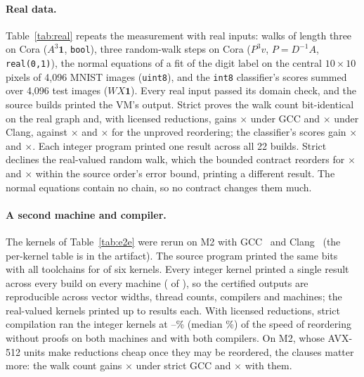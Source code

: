 \documentclass[acmsmall,review,anonymous,nonacm]{acmart}
\begin{document}
\paragraph{Real data.}
\begin{table}[t]
\caption{RQ4 on real data, on M2. Four programs over the Cora citation graph
and MNIST, columns as in Table~\ref{tab:e2e} (\emph{threads}: strict with
licensed reductions on \LlvmCores{} threads), compiled by GCC~\LlvmGcc{} and
Clang~\LlvmClang. Results counts distinct outputs over all builds of both
compilers.}
\label{tab:real}\centering\footnotesize\setlength{\tabcolsep}{4pt}
\end{table}
Table~\ref{tab:real} repeats the measurement with real inputs: walks of length
three on Cora ($A^3\mathbf 1$, \texttt{bool}), three random-walk steps on Cora
($P^3v$, $P=D^{-1}A$, \texttt{real(0,1)}), the normal equations of a fit of the
digit label on the central $10\times10$ pixels of 4,096 MNIST images
(\texttt{uint8}), and the \texttt{int8} classifier's scores summed over 4,096
test images ($WX\mathbf 1$). Every real input passed its domain check, and the
source builds printed the VM's output. Strict proves the walk count
bit-identical on the real graph and, with licensed reductions, gains
\RealCoraWalksClausesGcc$\times$ under GCC and \RealCoraWalksClausesClang$\times$
under Clang, against \RealCoraWalksAlgebraicGcc$\times$ and
\RealCoraWalksAlgebraicClang$\times$ for the unproved reordering; the
classifier's scores gain \RealMnistScoresClausesGcc$\times$ and
\RealMnistScoresClausesClang$\times$. Each integer program printed one result
across all 22 builds. Strict declines the real-valued random walk, which the
bounded contract reorders for \RealCoraDiffusionBoundedGcc$\times$ and
\RealCoraDiffusionBoundedClang$\times$ within the source order's error bound,
printing a different result. The normal equations contain no chain, so no
contract changes them much.

\paragraph{A second machine and compiler.} The kernels of Table~\ref{tab:e2e}
were rerun on M2 with GCC~\LlvmGcc{} and Clang~\LlvmClang{} (the per-kernel
table is in the artifact). The source program printed the same bits with all \PlatRuns{} toolchains
for \PlatSourceAgree{} of six kernels. Every integer kernel printed a single
result across every build on every machine (\PlatIntegerOneResult{} of
\PlatIntegerKernels), so the certified outputs are reproducible across vector
widths, thread counts, compilers and machines; the real-valued kernels printed
up to \PlatRealResultsMax{} results each. With licensed reductions, strict
compilation ran the integer kernels at
\PlatStrictOfAlgebraicLo--\PlatStrictOfAlgebraicHi\% (median
\PlatStrictOfAlgebraicMedian\%) of the speed of reordering without proofs on
both machines and with both compilers. On M2, whose AVX-512 units make
reductions cheap once they may be reordered, the clauses matter more: the walk
count gains \PlatWalksStrictSecondGcc$\times$ under strict GCC and
\PlatWalksClausesSecondGcc$\times$ with them.
\end{document}
